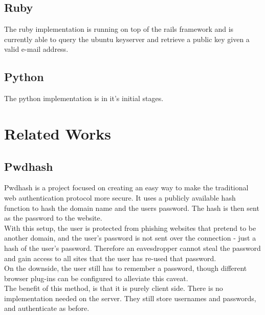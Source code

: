 \documentclass[11pt]{article}
\begin{document}
\subsection{Ruby} \label{subsec:ruby}
The ruby implementation is running on top of the rails framework and is currently able to query the ubuntu keyserver and retrieve a public key given a valid e-mail address. 
\subsection{Python} \label{subsec:python}
The python implementation is in it's initial stages. 

\section{Related Works} \label{sec:relatedWorks}
\subsection{Pwdhash} 
Pwdhash\cite{pwdhash} is a project focused on creating an easy way to make the traditional web authentication protocol more secure. It uses a publicly available hash function to hash the domain name and the users password. The hash is then sent as the password to the website.\\
	With this setup, the user is protected from phishing websites that pretend to be another domain, and the user’s password is not sent over the connection - just a hash of the user's password. Therefore an eavesdropper cannot steal the password and gain access to all sites that the user has re-used that password.\\
	On the downside, the user still has to remember a password, though different browser plug-ins can be configured to alleviate this caveat.\\
The benefit of this method, is that it is purely client side. There is no implementation needed on the server. They still store usernames and passwords, and authenticate as before.
\end{document}
